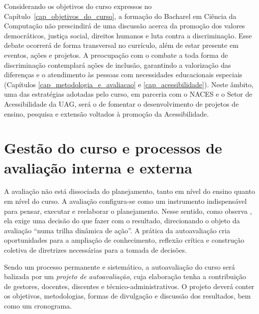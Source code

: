 \documentclass[
	12pt,				%
	openright,			%
  oneside,     %
	a4paper,			%
 hyphens,
	chapter=TITLE,		%
	english,			%
	french,				%
	spanish,			%
	brazil				%
	]{abntex2}
\begin{document}
Considerando os objetivos do curso expressos no Capítulo~\ref{cap_objetivos_do_curso}, a formação do Bacharel em Ciência da Computação não prescindirá de uma discussão acerca da promoção dos valores democráticos, justiça social, direitos humanos e luta contra a discriminação. Esse debate ocorrerá de forma transversal no currículo, além de estar presente em eventos, ações e projetos. A preocupação com o combate a toda forma de discriminação contemplará ações de inclusão, garantindo a valorização das diferenças e o atendimento às pessoas com necessidades educacionais especiais (Capítulos \ref{cap_metodologia_e_avaliacao} e \ref{cap_acessibilidade}). Neste âmbito, uma das estratégias adotadas pelo curso, em parceria com o NACES e o Setor de Acessibilidade da UAG, será o de fomentar o desenvolvimento de projetos de ensino, pesquisa e extensão voltados à promoção da Acessibilidade.






%
%






\chapter{Gestão do curso e processos de avaliação interna e externa}
\label{cap_gestao_do_curso_e_processos_de_avaliacao_interna_e_externa}

A avaliação não está dissociada do planejamento, tanto em nível do ensino quanto em nível do curso. A avaliação configura-se como um instrumento indispensável para pensar, executar e reelaborar o planejamento. Nesse sentido, como observa , ela exige uma decisão do que fazer com o resultado, direcionando o objeto da avaliação “numa trilha dinâmica de ação”. A prática da autoavaliação cria oportunidades para a ampliação de conhecimento, reflexão crítica e construção coletiva de diretrizes necessárias para a tomada de decisões.

Sendo um processo permanente e sistemático, a autoavaliação do curso será balizada por um \textit{projeto de autoavaliação}, cuja elaboração tenha a contribuição de gestores, docentes, discentes e técnico-administrativos. O projeto deverá conter os objetivos, metodologias, formas de divulgação e discussão dos resultados, bem como um cronograma.
\end{document}
